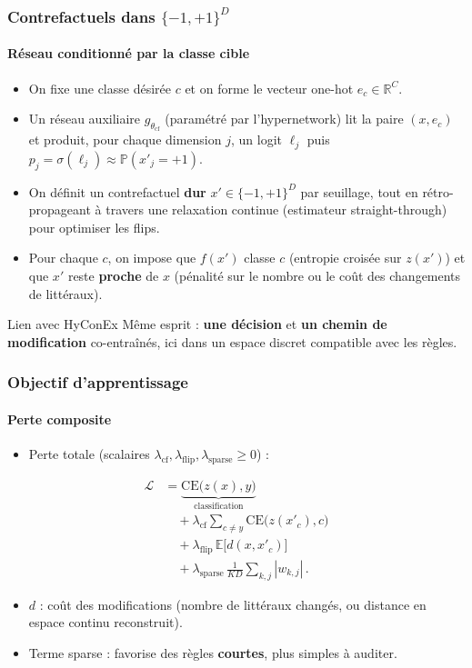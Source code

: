 \documentclass{beamer}
\begin{document}
\begin{frame}
\frametitle{Contrefactuels dans $\{-1,+1\}^D$}
\framesubtitle{Réseau conditionné par la classe cible}

\begin{itemize}
    \item On fixe une classe désirée $c$ et on forme le vecteur one-hot $e_c \in \mathbb{R}^C$.
    \item Un réseau auxiliaire $g_{\theta_{\text{cf}}}$ (paramétré par l'hypernetwork) lit la paire $(x, e_c)$ et produit, pour chaque dimension $j$, un logit $\ell_j$ puis $p_j = \sigma(\ell_j) \approx \mathbb{P}(x'_j = +1)$.
    \item On définit un contrefactuel \textbf{dur} $x' \in \{-1,+1\}^D$ par seuillage, tout en rétro-propageant à travers une relaxation continue (estimateur straight-through) pour optimiser les flips.
    \item Pour chaque $c$, on impose que $f(x')$ classe $c$ (entropie croisée sur $z(x')$) et que $x'$ reste \textbf{proche} de $x$ (pénalité sur le nombre ou le coût des changements de littéraux).
\end{itemize}

\begin{block}{Lien avec HyConEx}
Même esprit : \textbf{une décision} et \textbf{un chemin de modification} co-entraînés, ici dans un espace discret compatible avec les règles.
\end{block}

\end{frame}

\begin{frame}
\frametitle{Objectif d'apprentissage}
\framesubtitle{Perte composite}

\begin{itemize}
    \item Perte totale (scalaires $\lambda_{\text{cf}}, \lambda_{\text{flip}}, \lambda_{\text{sparse}} \geq 0$) :
\end{itemize}

\vspace{-0.2cm}
\[
\begin{aligned}
\mathcal{L}
    &= \underbrace{\mathrm{CE}\bigl(z(x), y\bigr)}_{\text{classification}} \\[0.35em]
    &\quad + \lambda_{\text{cf}} \sum_{c \neq y} \mathrm{CE}\bigl(z(x'_c), c\bigr) \\[0.35em]
    &\quad + \lambda_{\text{flip}}\, \mathbb{E}\bigl[d(x, x'_c)\bigr] \\[0.35em]
    &\quad + \lambda_{\text{sparse}}\, \frac{1}{KD}\sum_{k,j} |w_{k,j}|\,.
\end{aligned}
\]

\vspace{0.2cm}
\begin{itemize}
    \item $d$ : coût des modifications (nombre de littéraux changés, ou distance en espace continu reconstruit).
    \item Terme sparse : favorise des règles \textbf{courtes}, plus simples à auditer.
\end{itemize}

\end{frame}
\end{document}

